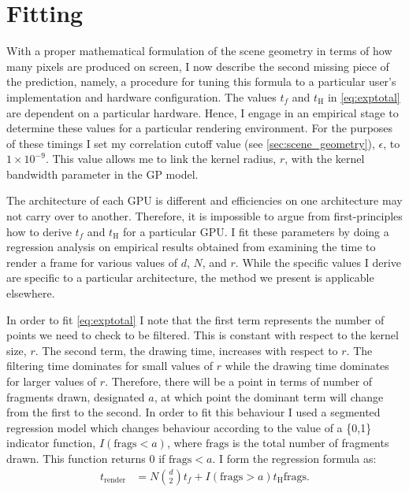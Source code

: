 \section{Fitting}
\label{sec:fitting}

With a proper mathematical formulation of the scene geometry in terms of how
many pixels are produced on screen, I now describe the second missing piece of
the prediction, namely, a procedure for tuning this formula to a particular
user's implementation and hardware configuration.  The values $t_f$ and
$t_\text{H}$ in \autoref{eq:exptotal} are dependent on a particular hardware.
Hence, I engage in an empirical stage to determine these values for a
particular rendering environment.  For the purposes of these timings I set my
correlation cutoff value (see \autoref{sec:scene_geometry}), $\epsilon$, to $1
\times 10^{-9}$. This value allows me to link the kernel radius, $r$, with the
kernel bandwidth parameter in the GP model.

The architecture of each GPU is different and efficiencies on one 
architecture may not carry over to another.
Therefore, it is
impossible to argue from first-principles how to derive $t_f$ and $t_\text{H}$ 
for a
particular GPU. I fit these parameters by doing a regression analysis
on empirical results obtained from examining the time to render a frame for
various values of $d$, $N$, and $r$. While the specific values I derive are 
specific to a particular architecture,
the method we present is applicable
elsewhere. 

In order to fit \autoref{eq:exptotal} I note that the first term
represents the number of points we need to check to be filtered. This is 
constant
with respect to the kernel size, $r$. The second term, the drawing
time, increases with respect to $r$. The filtering time dominates
for small values of $r$ while the drawing time dominates for larger values of 
$r$.
Therefore, there will be a point in terms of number of fragments drawn, 
designated $a$, at which point the dominant term will change from the first to
the second. In order to fit this behaviour I used a segmented regression
model which changes behaviour according to the value of a \{0,1\} indicator
function, $I(\text{frags}<a)$, where $\text{frags}$ is the total number of 
fragments drawn. This 
function returns 0 if $\text{frags} < a$. I form the regression
formula as:
\begin{align}
  t_\text{render} &= N {d \choose 2} t_f + I(\text{frags} > a) t_\text{H} \text{frags}  \text{.}
  \label{eq:calib-acttotal-H}
\end{align}

